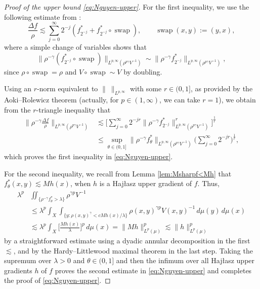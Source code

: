 \documentclass[11pt]{amsart}
\theoremstyle{definition}
\theoremstyle{remark}
\numberwithin{equation}{section}
\newcommand{\Norm}[2]{\|#1\|_{#2}}
\newcommand{\BNorm}[2]{\Big\|#1\Big\|_{#2}}
\begin{document}
\begin{proof}[Proof of the upper bound \eqref{eq:Nguyen-upper}]
For the first inequality, we use the following estimate from \cite[Lemma 2.1]{DLYYZ}:
\begin{equation}\label{eq:swap}
  \frac{\Delta
  f}{\rho}\lesssim\sum_{j=0}^\infty2^{-j}(f_{2^{-j}}^*+f_{2^{-j}}^*\circ\operatorname{swap}),\qquad
  \operatorname{swap}(x,y):=(y,x),
\end{equation}
where a simple change of variables shows that
\begin{equation}\label{eq:rid-of-swap}
  \Norm{\rho^{-\gamma}(f_{2^{-j}}^*\circ\operatorname{swap})}{
     L^{p,\infty}(\rho^{p\gamma}V^{-1})}
   \sim\Norm{\rho^{-\gamma}f_{2^{-j}}^*}{
     L^{p,\infty}(\rho^{p\gamma}V^{-1})},
\end{equation}
since $\rho\circ\operatorname{swap}=\rho$ and $V\circ\operatorname{swap}\sim V$ by doubling.

Using an $r$-norm equivalent to $\Norm{\ }{L^{p,\infty}}$ with some $r\in(0,1]$, as provided
by the Aoki--Rolewicz theorem (actually, for $p\in(1,\infty)$, we can take $r=1$), we obtain
from the $r$-triangle inequality that
\begin{equation}\label{eq:ar}
\begin{split}
  \BNorm{\rho^{-\gamma}\frac{\Delta f}{\rho}}{L^{p,\infty}(\rho^{p\gamma}V^{-1})}
  &\lesssim
  \Big[\sum_{j=0}^\infty 2^{-jr}\Norm{\rho^{-\gamma}f_{2^{-j}}^*}{
     L^{p,\infty}(\rho^{p\gamma}V^{-1})}^r \Big]^{\frac1r} \\
  &\leq\sup_{\theta\in(0,1]}\Norm{\rho^{-\gamma}f_{\theta}^*}{
     L^{p,\infty}(\rho^{p\gamma}V^{-1})}\Big(\sum_{j=0}^\infty 2^{-jr}\Big)^{\frac1r},
\end{split}
\end{equation}
which proves the first inequality in \eqref{eq:Nguyen-upper}.

For the second inequality, we recall from Lemma \ref{lem:Msharpf<Mh} that
$f_\theta^*(x,y)\lesssim Mh(x)$, when $h$ is a Haj\l{}asz upper gradient of $f$. Thus,
\begin{equation*}
\begin{split}
  \lambda^p &\iint_{\{\rho^{-\gamma}f_\theta^*>\lambda\}}\rho^{\gamma p}V^{-1} \\
  &\leq\lambda^p\int_X \int_{ \{ y: \rho(x,y)^{\gamma}<c Mh(x) / \lambda \}}
  \rho(x,y)^{\gamma p}V(x,y)^{-1}\,d\mu(y)\,d\mu(x) \\
  &\lesssim\lambda^p\int_X\Big[\frac{Mh(x)}{\lambda}\Big]^p \,d\mu(x)
  =\Norm{Mh}{L^p(\mu)}^p\lesssim\Norm{h}{L^p(\mu)}^p
\end{split}
\end{equation*}
by a straightforward estimate using a dyadic annular decomposition in the first $\lesssim$,
and
by the Hardy--Littlewood maximal theorem in the last step. Taking the supremum over
$\lambda>0$ and $\theta\in(0,1]$ and then the infimum over all Haj\l{}asz upper gradients $h$ of
$f$ proves the second estimate in \eqref{eq:Nguyen-upper} and completes the proof of
\eqref{eq:Nguyen-upper}.
\end{proof}
\end{document}
